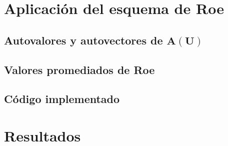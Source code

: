 \section{Aplicación del esquema de Roe}
\subsection{Autovalores y autovectores de $\mathbf{A}(\mathbf{U})$}
\subsection{Valores promediados de Roe}
\subsection{Código implementado}
\section{Resultados}
